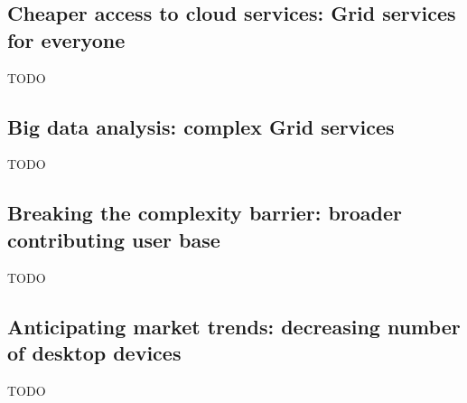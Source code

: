 \subsection{Cheaper access to cloud services: Grid services for everyone}\label{cheaper_access_to_cloud_services}
TODO

\subsection{Big data analysis: complex Grid services}
TODO

\subsection{Breaking the complexity barrier: broader contributing user base}
TODO

\subsection{Anticipating market trends: decreasing number of desktop devices}
TODO